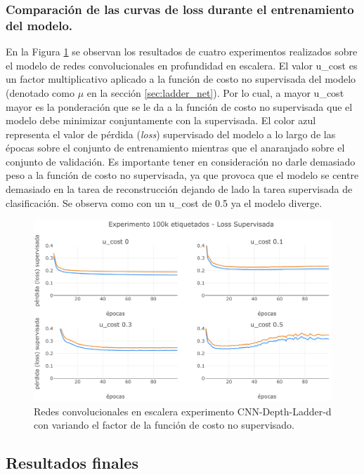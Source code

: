 \subsubsection{Comparación de las curvas de loss durante el entrenamiento del modelo.}

En la Figura \ref{fig:CNN_depth_ladder_loss} se observan los resultados de cuatro experimentos realizados sobre el modelo de redes convolucionales en profundidad en escalera. El valor u\_cost es un factor multiplicativo aplicado a la función de costo no supervisada del modelo (denotado como $\mu$ en la sección \ref{sec:ladder_net}). Por lo cual, a mayor u\_cost mayor es la ponderación que se le da a la función de costo no supervisada que el modelo debe minimizar conjuntamente con la supervisada. El color azul representa el valor de pérdida (\textit{loss}) supervisado del modelo a lo largo de las épocas sobre el conjunto de entrenamiento mientras que el anaranjado sobre el conjunto de validación. Es importante tener en consideración no darle demasiado peso a la función de costo no supervisada, ya que provoca que el modelo se centre demasiado en la tarea de reconstrucción dejando de lado la tarea supervisada de clasificación. Se observa como con un u\_cost de 0.5 ya el modelo diverge.

\begin{figure}[t]
\begin{center}
\includegraphics[width=.9\linewidth]{images/CNN_depth_ladder_loss.png}
\caption{Redes convolucionales en escalera experimento CNN-Depth-Ladder-d con variando el factor de la función de costo no supervisado.}
\label{fig:CNN_depth_ladder_loss}
\end{center}
\end{figure}

\subsection{Resultados finales}

